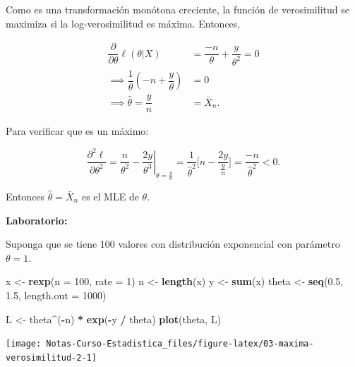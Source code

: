 \documentclass[
  12pt,
]{book}
\newenvironment{Shaded}{\begin{snugshade}}{\end{snugshade}}
\newcommand{\DataTypeTok}[1]{\textcolor[rgb]{0.13,0.29,0.53}{#1}}
\newcommand{\DecValTok}[1]{\textcolor[rgb]{0.00,0.00,0.81}{#1}}
\newcommand{\FloatTok}[1]{\textcolor[rgb]{0.00,0.00,0.81}{#1}}
\newcommand{\KeywordTok}[1]{\textcolor[rgb]{0.13,0.29,0.53}{\textbf{#1}}}
\newcommand{\NormalTok}[1]{#1}
\newcommand{\OperatorTok}[1]{\textcolor[rgb]{0.81,0.36,0.00}{\textbf{#1}}}
\newcommand{\StringTok}[1]{\textcolor[rgb]{0.31,0.60,0.02}{#1}}
\begin{document}
Como es una transformación monótona creciente, la función de verosimilitud se
maximiza si la log-verosimilitud es máxima. Entonces,

\begin{align*}
\dfrac{\partial}{\partial\theta} \ell(\theta|X) & = \dfrac{-n}{\theta}+\dfrac{y}{\theta^2} = 0 \\
\implies \dfrac{1}{\theta}\left(-n+\dfrac{y}\theta\right) & =0  \\
\implies \hat\theta = \dfrac{y}{n} & = \bar X_n.
\end{align*}

Para verificar que es un máximo:

\[\dfrac{\partial^2    \ell}{\partial\theta^2} = \left. \dfrac{n}{\theta^2} -\dfrac{2y}{\theta^3}\right\vert_{\theta = \frac{y}{n}} = \dfrac{1}{\hat\theta^2} \bigg[n-\dfrac{2y}{\frac yn}\bigg] = \dfrac{-n}{\hat\theta^2} < 0.\]

Entonces \(\hat\theta = \bar X_n\) es el MLE de \(\theta\).

\textbf{Laboratorio:}

Suponga que se tiene 100 valores con distribución exponencial con parámetro
\(\theta=1\).

\begin{Shaded}
\begin{Highlighting}[]
\NormalTok{x  \textless{}{-}}\StringTok{ }\KeywordTok{rexp}\NormalTok{(}\DataTypeTok{n =} \DecValTok{100}\NormalTok{, }\DataTypeTok{rate =} \DecValTok{1}\NormalTok{)}
\NormalTok{n \textless{}{-}}\StringTok{ }\KeywordTok{length}\NormalTok{(x)}
\NormalTok{y \textless{}{-}}\StringTok{ }\KeywordTok{sum}\NormalTok{(x)}
\NormalTok{theta \textless{}{-}}\StringTok{ }\KeywordTok{seq}\NormalTok{(}\FloatTok{0.5}\NormalTok{, }\FloatTok{1.5}\NormalTok{, }\DataTypeTok{length.out =} \DecValTok{1000}\NormalTok{)}
\end{Highlighting}
\end{Shaded}

\begin{Shaded}
\begin{Highlighting}[]
\NormalTok{L \textless{}{-}}\StringTok{ }\NormalTok{theta}\OperatorTok{\^{}}\NormalTok{(}\OperatorTok{{-}}\NormalTok{n) }\OperatorTok{*}\StringTok{ }\KeywordTok{exp}\NormalTok{(}\OperatorTok{{-}}\NormalTok{y }\OperatorTok{/}\StringTok{ }\NormalTok{theta)}
\KeywordTok{plot}\NormalTok{(theta, L)}
\end{Highlighting}
\end{Shaded}

\begin{center}\texttt{[image: Notas-Curso-Estadistica\_files/figure-latex/03-maxima-verosimilitud-2-1]} \end{center}
\end{document}
